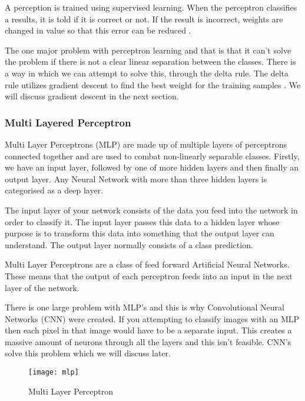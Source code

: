 A perception is trained using supervised learning. When the perceptron
classifies a results, it is told if it is correct or not. If the result is
incorrect, weights are changed in value so that this error can be reduced
\textcite{AI}. 

The one major problem with perceptron learning and that is that it can't solve
the problem if there is not a clear linear separation between the classes. There
is a way in which we can attempt to solve this, through the delta rule. The
delta rule utilizes gradient descent to find the best weight for the training
samples \textcite{MLANN}. We will discuss gradient descent in the next section.

\subsubsection*{Multi Layered Perceptron}
Multi Layer Perceptrons (MLP) are made up of multiple layers of perceptrons connected
together and are used to combat non-linearly separable classes.
Firstly, we have an input layer, followed by one of more hidden layers and then
finally an output layer.
Any Neural Network with more than three hidden layers is categorised as a deep
layer.

The input layer of your network consists of the data you feed into the network
in order to classify it. The input layer passes this data to a hidden layer
whose purpose is to transform this data into something that the output layer can
understand. The output layer normally consists of a class prediction.

Multi Layer Perceptrons are a class of feed forward Artificial Neural Networks.
These means that the output of each perceptron feeds into an input in the next
layer of the network.

There is one large problem with MLP's and this is why Convolutional Neural
Networks (CNN) were created. If you attempting to classify images with an MLP then
each pixel in that image would have to be a separate input. This creates a
massive amount of neurons through all the layers and this isn't feasible. CNN's
solve this problem which we will discuss later.

\begin{figure}
    \texttt{[image: mlp]}
     \caption{Multi Layer Perceptron}
     \label{fig:mlp}
\end{figure}

